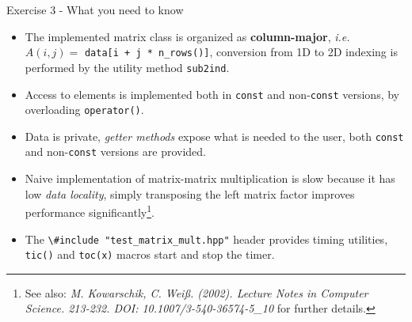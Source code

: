 \documentclass[10pt,aspectratio=169]{beamer}
\begin{document}
\begin{frame}{Exercise 3 - What you need to know}
\begin{itemize}
\item The implemented matrix class is organized as
      \textbf{column-major}, \textit{i.e.}
      $A(i, j) = $ \lstinline{data[i + j * n_rows()]},
      conversion from 1D to 2D indexing is performed by the utility
      method \lstinline{sub2ind}.\\[3mm]
\item Access to elements is implemented both in \texttt{const} and non-\texttt{const} versions, by overloading \lstinline{operator()}. \\[3mm]
\item Data is private, \textit{getter methods} expose what is needed to the user, both \texttt{const} and non-\texttt{const} versions are provided. \\[3mm]
\item Naive implementation of matrix-matrix multiplication is slow because it has low \textit{data locality}, simply transposing the left matrix factor improves performance significantly\footnote{See also: \textit{M. Kowarschik, C. Weiß. (2002). Lecture Notes in Computer Science. 213-232. DOI: 10.1007/3-540-36574-5\_10} for further details.}.\\[3mm]
\item The \lstinline{\#include "test_matrix_mult.hpp"} header provides timing utilities, \lstinline{tic()} and \lstinline{toc(x)} macros start and stop the timer.
\end{itemize}
\end{frame}
\end{document}
